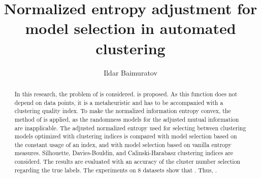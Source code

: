 \documentclass{article}
\author{Ildar Baimuratov}
\title{Normalized entropy adjustment for model selection in automated clustering}
\begin{document}
\maketitle

\begin{abstract}
In this research, the problem of  is considered.  is proposed. As this function does not depend on data points, it is a metaheuristic and has to be accompanied with a clustering quality index. To make the normalized information entropy convex, the method of  is applied, as the randomness models for the adjusted mutual information are inapplicable. The adjusted normalized entropy used for selecting between clustering models optimized with clustering indices is compared with model selection based on the constant usage of an index, and with model selection based on vanilla entropy measures. Silhouette, Davies-Bouldin, and Calinski-Harabasz clustering indices are considerd. The results are evaluated with an accuracy of the cluster number selection regarding the true labels. The experiments on 8 datasets show that . Thus, .
\end{abstract}
\end{document}
